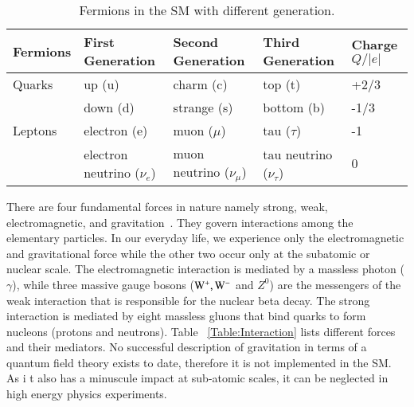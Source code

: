 \begin{table}
\caption{\small{Fermions in the SM with different generation.}}
\begin{center}
    \begin{tabular}{ | l | l | l |l| p{1.5cm}|}
    \hline
     {\bf Fermions}  &  {\bf First Generation} & {\bf Second Generation}  & {\bf Third Generation} & {\bf Charge $Q/|e|$}  \\ \hline \hline
     Quarks & up (u)  & charm (c) & top (t) & +2/3 \\
            & down (d)& strange (s) & bottom (b) &-1/3 \\ \hline
     Leptons & electron (e) & muon ($\mu$) & tau ($\tau$) &  -1 \\ 
             & electron neutrino ($\nu_e$) & muon neutrino ($\nu_\mu$) & tau neutrino ($\nu_\tau$) &  0 \\ \hline 
             \end{tabular}
             \label{Table:Fermions in SM}
    \end{center}     
\end{table}
There are four fundamental forces in nature namely strong, weak, electromagnetic, and gravitation~\cite{particlephysics}. They govern interactions among the elementary particles. In our everyday life, we experience only the electromagnetic and gravitational force while the other two occur only at the subatomic or nuclear scale. The electromagnetic interaction is mediated by a massless photon ($\gamma$), while three massive gauge bosons ($\rm W^+, W^-$ and $Z^0 $) are the messengers of the weak interaction that is responsible for the nuclear beta decay. The strong interaction is mediated by eight massless gluons that bind quarks to form nucleons (protons and neutrons). Table ~\ref{Table:Interaction} lists different forces and their mediators. No successful description of gravitation in terms of a quantum field theory exists to  date, therefore it is not implemented in the SM. As i	t also has a  minuscule impact at sub-atomic scales, it can be neglected in high energy physics experiments.

